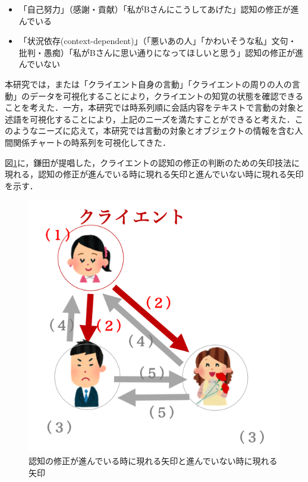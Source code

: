 \documentclass[shuuron]{kuee}
\begin{document}
\begin{itemize}
  \item 「自己努力」（感謝・貢献）「私がBさんにこうしてあげた」認知の修正が進んでいる
  \item 「状況依存(context-dependent)」（「悪いあの人」「かわいそうな私」文句・批判・愚痴）「私がBさんに思い通りになってほしいと思う」認知の修正が進んでいない
\end{itemize}

本研究では，または「クライエント自身の言動」「クライエントの周りの人の言動」のデータを可視化することにより，クライエントの知覚の状態を確認できることを考えた．一方，本研究では時系列順に会話内容をテキストで言動の対象と述語を可視化することにより，上記のニーズを満たすことができると考えた．このようなニーズに応えて，本研究では言動の対象とオブジェクトの情報を含む人間関係チャートの時系列を可視化してきた．

図\ref{fig:arrow}に，鎌田\cite{鎌田穣2002臨床}が提唱した，クライエントの認知の修正の判断のための矢印技法に現れる，認知の修正が進んでいる時に現れる矢印と進んでいない時に現れる矢印を示す．

\begin{figure}
  \begin{center}
    \includegraphics[width=\linewidth]{arrow.png}
  \end{center}
  \caption{認知の修正が進んでいる時に現れる矢印と進んでいない時に現れる矢印}
  \label{fig:arrow}
\end{figure}
\end{document}
